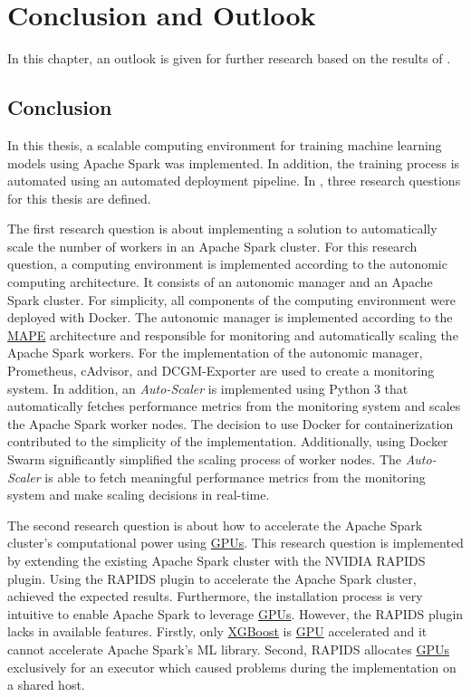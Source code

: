 \chapter{Conclusion and Outlook}
\label{chap:08_conclusion-outlook}

In this chapter, an outlook is given for further research based on the results of .


\section{Conclusion}
\label{sec:08_conclusion}
In this thesis, a scalable computing environment for training machine learning models using Apache Spark was implemented. In addition, the training process is automated using an automated deployment pipeline.
In , three research questions for this thesis are defined.


The first research question is about implementing a solution to automatically scale the number of workers in an Apache Spark cluster.
For this research question, a computing environment is implemented according to the autonomic computing architecture.
It consists of an autonomic manager and an Apache Spark cluster.
For simplicity, all components of the computing environment were deployed with Docker.
The autonomic manager is implemented according to the \hyperlink{abbr:mape}{MAPE} architecture and responsible for monitoring and automatically scaling the Apache Spark workers.
For the implementation of the autonomic manager, Prometheus, cAdvisor, and DCGM-Exporter are used to create a monitoring system.
In addition, an \textit{Auto-Scaler} is implemented using Python 3 that automatically fetches performance metrics from the monitoring system and scales the Apache Spark worker nodes.
The decision to use Docker for containerization contributed to the simplicity of the implementation. Additionally, using Docker Swarm significantly simplified the scaling process of worker nodes. The \textit{Auto-Scaler} is able to fetch meaningful performance metrics from the monitoring system and make scaling decisions in real-time.


The second research question is about how to accelerate the Apache Spark cluster's computational power using \hyperlink{abbr:gpu}{GPUs}.
This research question is implemented by extending the existing Apache Spark cluster with the NVIDIA RAPIDS plugin.
Using the RAPIDS plugin to accelerate the Apache Spark cluster, achieved the expected results. Furthermore, the installation process is very intuitive to enable Apache Spark to leverage \hyperlink{abbr:gpu}{GPUs}. However, the RAPIDS plugin lacks in available features. Firstly, only \hyperlink{abbr:xgboost}{XGBoost} is \hyperlink{abbr:gpu}{GPU} accelerated and it cannot accelerate Apache Spark's ML library. Second, RAPIDS allocates \hyperlink{abbr:gpu}{GPUs} exclusively for an executor which caused problems during the implementation on a shared host.


